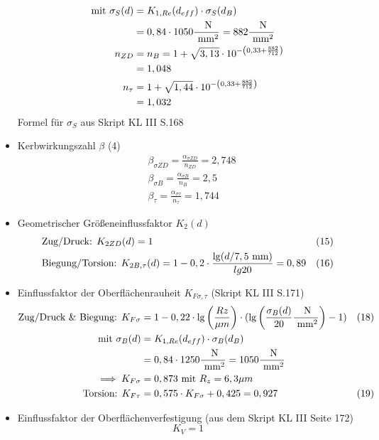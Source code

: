 \begin{itemize}
\begin{align*}
		\text{mit } \sigma_S (d) &= K_{1,Re} (d_{eff}) \cdot \sigma_S (d_B) \\
		&= 0,84 \cdot 1050 \frac{\text{ N}}{\text{ mm}^2} = 882 \frac{\text{ N}}{\text{ mm}^2} \\
		n_{ZD} &= n_B = 1 + \sqrt{3,13} \cdot 10 ^{-\left( 0,33 + \frac{882}{712} \right)} \\
		&=1,048 \\
		n_{\tau} &= 1 + \sqrt{1,44} \cdot 10 ^{-\left( 0,33 + \frac{882}{712} \right)} \\
		&= 1,032 
	\end{align*}
	Formel für $\sigma_S$ aus Skript KL III  S.168
\item Kerbwirkungszahl $\beta$ \hfill (4)
	\begin{align*}
		&\beta_{\sigma ZD} = \frac{\alpha_{\sigma ZD}}{n_{ZD}} = 2,748 \\
		&\beta_{\sigma B} = \frac{\alpha_{\sigma B}}{n_{B}} = 2,5 \\
		&\beta_{ \tau} = \frac{\alpha_{\sigma \tau}}{n_{\tau}} = 1,744 
	\end{align*}
\item Geometrischer Größeneinflussfaktor $K_2 (d)$ 
	\begin{align*}
		&\text{Zug/Druck: }K_{2ZD} (d) = 1 & (15) \\
		&\text{Biegung/Torsion: } K_{2B,\tau} (d) = 1 -0,2 \cdot  \frac{\lg (d / 7,5 \text{ mm})}{lg 20}  = 0,89 &(16) 
	\end{align*}
\item Einflussfaktor der Oberflächenrauheit $K_{F\sigma, \tau}$ (Skript KL III  S.171)
	\begin{align*}
		\text{Zug/Druck \& Biegung: } K_{F\sigma} &= 1 - 0,22 \cdot \lg \left( \frac{Rz}{\mu m}\right) \cdot ( \lg \left( \frac{\sigma_B (d)}{20}\frac{\text{ N}}{\text{ mm}^2}\right) -1 ) &(18) \\
		\text{mit } \sigma_B (d) &= K_{1,Re} (d_{eff}) \cdot \sigma_B (d_B) \\
		&= 0,84 \cdot 1250\frac{\text{ N}}{\text{ mm}^2} = 1050 \frac{\text{ N}}{\text{ mm}^2} \\
		\implies K_{F\sigma} &= 0,873 \text{ mit } R_z = 6,3 \mu m\\
		\text{Torsion: } K_{F\tau} &= 0,575 \cdot K_{F\sigma} +0,425 = 0,927 & (19) 
	\end{align*}
\item Einflussfaktor der Oberflächenverfestigung (aus dem Skript KL III  Seite 172)
	\[
		K_{V} = 1
\]
\end{itemize}

